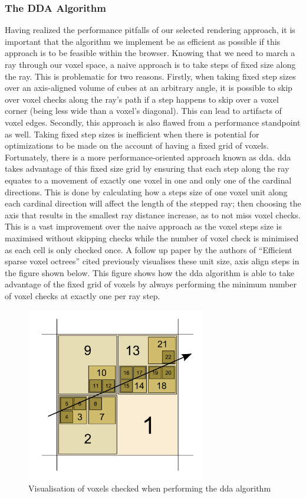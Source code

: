 \documentclass[titlepage]{article}
\begin{document}
\subsubsection{The DDA Algorithm}
Having realized the performance pitfalls of our selected rendering approach, it is important that the algorithm we implement be as efficient as possible if this approach is to be feasible within the browser. Knowing that we need to march a ray through our voxel space, a naive approach is to take steps of fixed size along the ray. This is problematic for two reasons. Firstly, when taking fixed step sizes over an axis-aligned volume of cubes at an arbitrary angle, it is possible to skip over voxel checks along the ray's path if a step happens to skip over a voxel corner (being less wide than a voxel's diagonal). This can lead to artifacts of voxel edges. Secondly, this approach is also flawed from a performance standpoint as well. Taking fixed step sizes is inefficient when there is potential for optimizations to be made on the account of having a fixed grid of voxels. Fortunately, there is a more performance-oriented approach known as \gls{dda}. \gls{dda} takes advantage of this fixed size grid by ensuring that each step along the ray equates to a movement of exactly one voxel in one and only one of the cardinal directions. This is done by calculating how a steps size of one voxel unit along each cardinal direction will affect the length of the stepped ray; then choosing the axis that results in the smallest ray distance increase, as to not miss voxel checks. This is a vast improvement over the naive approach as the voxel steps size is maximised without skipping checks while the number of voxel check is minimised as each cell is only checked once. A follow up paper \cite{dda} by the authors of ``Efficient sparse voxel octrees'' cited previously visualises these unit size, axis align steps in the figure shown below. This figure shows how the \gls{dda} algorithm is able to take advantage of the fixed grid of voxels by always performing the minimum number of voxel checks at exactly one per ray step.

\begin{figure}[htp]
  \centering
  \includegraphics[width=0.7\textwidth]{dda.png}
  \caption{Visualisation of voxels checked when performing the \gls{dda} algorithm}
\end{figure}
\FloatBarrier
\end{document}
